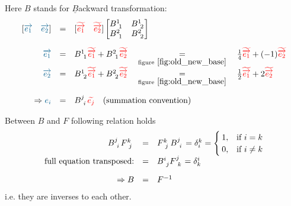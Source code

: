 Here $B$ stands for $\underline{B}$ackward transformation:
\begin{equation}
    \label{eq:backward_trafo}
    \begin{array}{rcl}
        [\hdbv{1} \quad \hdbv{2}] & = &
        [\hdbtv{1} \quad \hdbtv{2}]
        \begin{bmatrix}
            B^{1~}_{~1} & B^{1~}_{~2} \\
            B^{2~}_{~1} & B^{2~}_{~2}
        \end{bmatrix} \\
        \noalign{\vskip10pt}
        \hdbv{1} & = & B^{1~}_{~1}\hdbtv{1} + B^{2~}_{~1}\hdbtv{2}
        \quad \underset{\text{figure}~\ref{fig:old_new_base}}{=} \quad
        \frac{1}{4} \hdbtv{1} + (-1) \hdbtv{2}\\
        \hdbv{2} & = & B^{1~}_{~2}\hdbtv{1} + B^{2~}_{~2}\hdbtv{2}
        \quad \underset{\text{figure}~\ref{fig:old_new_base}}{=} \quad
        \frac{1}{2}\hdbtv{1} + 2 \hdbtv{2} \\
        \noalign{\vskip10pt}
        \Rightarrow \hdbvc{i} & = &
        B^{j~}_{~i}\hdbtvc{j}\quad\text{(summation convention)}
    \end{array}
\end{equation}

Between $B$ and $F$ following relation holds
\begin{equation}
    \label{eq:forward_backward_inverse}
    \begin{array}{rcl}
        B^{j~}_{~i} F^{k~}_{~j} & = & F^{k~}_{~j} B^{j~}_{~i}
        = \delta^k_i =
        \begin{cases}
            1, & \text{if}\ i = k \\
            0, & \text{if}\ i \neq k
        \end{cases} \\
        \text{full equation transposed:} & = &
        B^{i~}_{~j} F^{j~}_{~k} = \delta^i_k \\
        \noalign{\vskip10pt}
        \Rightarrow B & = & F^{-1}
    \end{array}
\end{equation}
i.e. they are inverses to each other.


\newpage
